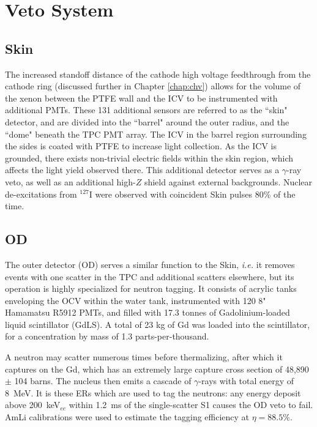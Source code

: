 \section{Veto System}
\label{sec:veto}
\subsection{Skin}
The increased standoff distance of the cathode high voltage feedthrough from the cathode ring (discussed further in Chapter \ref{chap:chv}) allows for the volume of the xenon between the PTFE wall and the ICV to be instrumented with additional PMTs.
These 131 additional sensors are referred to as the ``skin" detector, and are divided into the  ``barrel" around the outer radius, and the ``dome" beneath the TPC PMT array.
The ICV in the barrel region surrounding the sides is coated with PTFE to increase light collection.
As the ICV is grounded, there exists non-trivial electric fields within the skin region, which affects the light yield observed there.
This additional detector serves as a $\gamma$-ray veto, as well as an additional high-$Z$ shield against external backgrounds. 
Nuclear de-excitations from $^{127}$I were observed with coincident Skin pulses 80\% of the time\cite{aalbers_first_2022}.

\subsection{OD}

The outer detector (OD) serves a similar function to the Skin, \textit{i.e.} it removes events with one scatter in the TPC and additional scatters elsewhere, but its operation is highly specialized for neutron tagging.
It consists of acrylic tanks enveloping the OCV within the water tank, instrumented with 120 8" Hamamatsu R5912 PMTs, and filled with 17.3 tonnes of Gadolinium-loaded liquid scintillator (GdLS)\cite{turner_optical_2021}.
A total of 23 kg of Gd was loaded into the scintillator, for a concentration by mass of 1.3 parts-per-thousand\cite{haselschwardt_liquid_2019}.

A neutron may scatter numerous times before thermalizing, after which it captures on the Gd, which has an extremely large capture cross section of 48,890 $\pm$ 104 barns\cite{mughabghab_thermal_2003}.
The nucleus then emits a cascade of $\gamma$-rays with total energy of 8~MeV.
It is these ERs which are used to tag the neutrons: any energy deposit above 200~keV$_{ee}$ within 1.2~ms of the single-scatter S1 causes the OD veto to fail.
AmLi calibrations were used to estimate the tagging efficiency at $\eta =88.5\%$\cite{aalbers_first_2022}.

